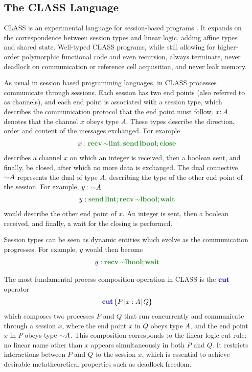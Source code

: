 \documentclass[sigconf,nonacm,natbib=true]{acmart}
\begin{document}
\subsection{The CLASS Language}

\acf{CLASS} is an experimental language for session-based programs \citep{Rocha:2023, Rocha:2022, Rocha:2021}. It expands on the correspondence between session types and linear logic, adding affine types and shared state. Well-typed \ac{CLASS} programs, while still allowing for higher-order polymorphic functional code and even recursion, always terminate, never deadlock on communication or reference cell acquisition, and never leak memory.

As usual in session based programming languages, in \ac{CLASS} processes communicate through sessions. Each session has two end points (also referred to as channels), and each end point is associated with a session type, which describes the communication protocol that the end point must follow. $x: A$ denotes that the channel $x$ obeys type $A$. These types describe the direction, order and content of the messages exchanged. For example
\[
    x : \recvt{\dualt{\lintt}}{\sendt{\lboolt}{\closet}}
\]
describes a channel $x$ on which an integer is received, then a boolean sent, and finally, be closed, after which no more data is exchanged. The dual connective $\dualt{A}$ represents the dual of type $A$, describing the type of the other end point of the session. For example, $y: \dualt{A}$
\[
    y : \sendt{\lintt}{\recvt{\dualt{\lboolt}}{\waitt}}
\]
would describe the other end point of $x$. An integer is sent, then a boolean received, and finally, a wait for the closing is performed.

Session types can be seen as dynamic entities which evolve as the communication progresses. For example, $y$ would then become
\[
    y : \recvt{\dualt{\lboolt}}{\waitt}
\]

The most fundamental process composition operation in \ac{CLASS} is the $\cutp$ operator
\[
    \cutc{P}{x: A}{Q}
\]
which composes two processes $P$ and $Q$ that run concurrently and communicate through a session $x$, where the end point $x$ in $Q$ obeys type $A$, and the end point $x$ in $P$ obeys type $\dualt{A}$. This composition corresponds to the linear logic cut rule: no linear name other than $x$ appears simultaneously in both $P$ and $Q$. It restricts interactions between $P$ and $Q$ to the session $x$, which is essential to achieve desirable metatheoretical properties such as deadlock freedom.
\end{document}
